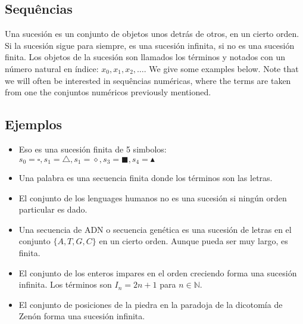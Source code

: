 \subsection*{Sequências}

Una sucesión es un conjunto de objetos unos detrás de otros, en un cierto orden.
Si la sucesión sigue para siempre, es una sucesión infinita, si no es una
sucesión finita. Los objetos de la sucesión son llamados los términos y
notados con un número natural en índice: $x_0, x_1, x_2, \ldots$. We give
some examples below. Note that we will often be interested in
sequências numéricas, where the terms are taken from one the conjuntos numéricos
previously mentioned.

\subsection*{Ejemplos}

\begin{itemize}
\item Eso es una sucesión finita de 5 simbolos:
  $s_0 = \square, s_1 = \triangle, s_1 = \diamond, s_3 = \blacksquare,
  s_4 = \blacktriangle$
\item Una palabra es una secuencia finita donde los términos son las letras.
\item El conjunto de los lenguages humanos no es una sucesión si ningún orden
  particular es dado.
\item Una secuencia de ADN o secuencia genética es una sucesión de letras en
  el conjunto  $\{ A, T, G, C \}$ en un cierto orden.
  Aunque pueda ser muy largo, es finita.
\item El conjunto de los enteros impares en el orden creciendo
  forma una sucesión
  infinita. Los términos son $I_n = 2n + 1$ para $n \in \mathbb N$.
\item El conjunto de posiciones de la piedra en la paradoja de la dicotomía de
  Zenón forma una sucesión infinita.
\begin{center}
\end{center}
\end{itemize}

